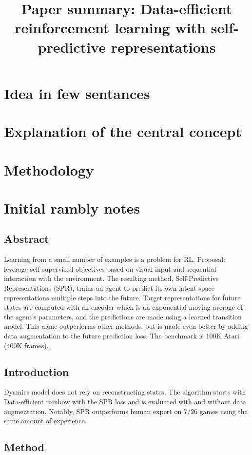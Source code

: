 \documentclass{article}
\title{Paper summary: Data-efficient reinforcement learning with self-predictive representations}
\begin{document}
\maketitle


\section{Idea in few sentances}

\section{Explanation of the central concept}

\section{Methodology}


\section{Initial rambly notes}

\subsection{Abstract}
Learning from a small number of examples is a problem for RL.
Proposal: leverage self-supervised objectives based on visual input 
and sequential interaction with the environment.
The resulting method, Self-Predictive Representations (SPR), trains an agent to predict its own
latent space representations multiple steps into the future.
Target representations for future states are computed with an encoder which is an exponential
moving average of the agent's parameters,
and the predictions are made using a learned transition model.
This alone outperforms other methods, but is made even better by adding 
data augmentation to the future prediction loss.
The benchmark is 100K Atari (400K frames).

\subsection{Introduction}
Dyamics model does not rely on reconstructing states.
The algorithm starts with Data-efficient rainbow with the SPR loss
and is evaluated with and without data augmentation.
Notably, SPR outperforms human expert on 7/26 games using the same amount of experience.

\subsection{Method}
\end{document}
